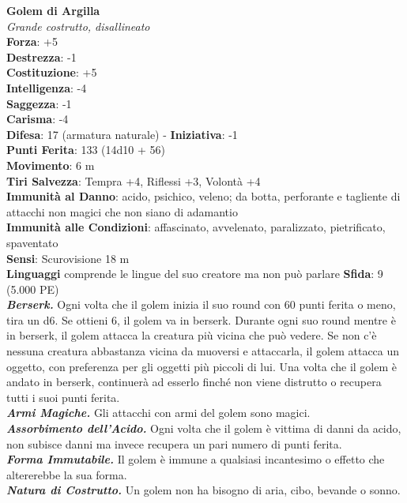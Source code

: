 \begin{multicols}{2}
\medskip\textbf{Golem di Argilla}\\
\emph{Grande costrutto, disallineato}\\
\textbf{Forza}: +5\\
\textbf{Destrezza}: -1\\
\textbf{Costituzione}: +5\\
\textbf{Intelligenza}: -4\\
\textbf{Saggezza}: -1\\
\textbf{Carisma}: -4\\
\textbf{Difesa}: 17 (armatura naturale) - \textbf{Iniziativa}: -1\\
\textbf{Punti Ferita}: 133 (14d10 + 56)\\
\textbf{Movimento}: 6 m\\
\textbf{Tiri Salvezza}: Tempra +4, Riflessi +3, Volontà +4\\
\textbf{Immunità al Danno}: acido, psichico, veleno; da botta, perforante e tagliente di attacchi non magici che non siano di adamantio\\
\textbf{Immunità alle Condizioni}: affascinato, avvelenato, paralizzato, pietrificato, spaventato\\
\textbf{Sensi}: Scurovisione 18 m\\
\textbf{Linguaggi} comprende le lingue del suo creatore ma non può parlare
\textbf{Sfida}: 9 (5.000 PE)\smallskip\\
\emph{\textbf{Berserk.}} Ogni volta che il golem inizia il suo round con 60 punti ferita o meno, tira un d6. Se ottieni 6, il golem va in berserk. Durante ogni suo round mentre è in berserk, il golem attacca la creatura più vicina che può vedere. Se non c'è nessuna creatura abbastanza vicina da muoversi e attaccarla, il golem attacca un oggetto, con preferenza per gli oggetti più piccoli di lui. Una volta che il golem è andato in berserk, continuerà ad esserlo finché non viene distrutto o recupera tutti i suoi punti ferita.\\
\emph{\textbf{Armi Magiche.}} Gli attacchi con armi del golem sono magici.\\
\emph{\textbf{Assorbimento dell'Acido.}} Ogni volta che il golem è vittima di danni da acido, non subisce danni ma invece recupera un pari numero di punti ferita.\\
\emph{\textbf{Forma Immutabile.}} Il golem è immune a qualsiasi incantesimo o effetto che altererebbe la sua forma. \\
\emph{\textbf{Natura di Costrutto.}} Un golem non ha bisogno di aria, cibo, bevande o sonno.\\

\end{multicols}
